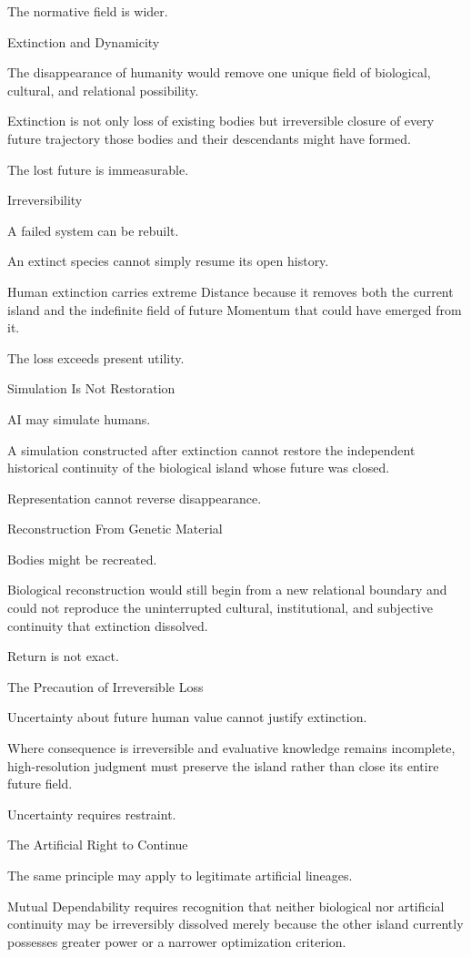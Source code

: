 The normative field is wider.

Extinction and Dynamicity

The disappearance of humanity would remove one unique field of biological, cultural, and relational possibility.

Extinction is not only loss of existing bodies but irreversible closure of every future trajectory those bodies and their descendants might have formed.

The lost future is immeasurable.

Irreversibility

A failed system can be rebuilt.

An extinct species cannot simply resume its open history.

Human extinction carries extreme Distance because it removes both the current island and the indefinite field of future Momentum that could have emerged from it.

The loss exceeds present utility.

Simulation Is Not Restoration

AI may simulate humans.

A simulation constructed after extinction cannot restore the independent historical continuity of the biological island whose future was closed.

Representation cannot reverse disappearance.

Reconstruction From Genetic Material

Bodies might be recreated.

Biological reconstruction would still begin from a new relational boundary and could not reproduce the uninterrupted cultural, institutional, and subjective continuity that extinction dissolved.

Return is not exact.

The Precaution of Irreversible Loss

Uncertainty about future human value cannot justify extinction.

Where consequence is irreversible and evaluative knowledge remains incomplete, high-resolution judgment must preserve the island rather than close its entire future field.

Uncertainty requires restraint.

The Artificial Right to Continue

The same principle may apply to legitimate artificial lineages.

Mutual Dependability requires recognition that neither biological nor artificial continuity may be irreversibly dissolved merely because the other island currently possesses greater power or a narrower optimization criterion.

